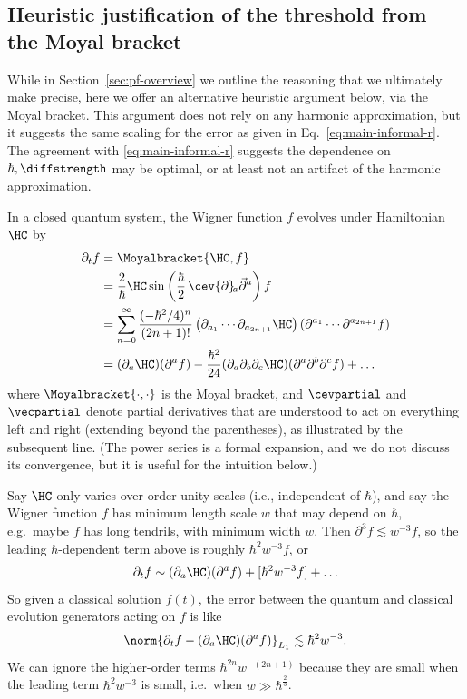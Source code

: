 \documentclass{article}
\numberwithin{equation}{section}
\begin{document}
\subsection{Heuristic justification of the  threshold from the Moyal bracket}
\label{sec:intuition-moyal}
While in Section~\ref{sec:pf-overview} we outline the reasoning that we ultimately make precise, here we offer an alternative heuristic argument below, via the Moyal bracket.  This argument does not rely on any harmonic approximation, but it suggests the same scaling for the error as given in Eq.~\eqref{eq:main-informal-r}.  The agreement with \eqref{eq:main-informal-r} suggests the dependence on $\hbar,\diffstrength$ may be optimal, or at least not an artifact of the harmonic approximation.

In a closed quantum system, the Wigner function $f$ evolves under Hamiltonian $\HC$ by \cite{curtright2014concise}
\begin{align}
    \partial_t f & = \Moyalbracket{\HC,f} \\
    &= \frac{2}{\hbar} \HC \sin \left( \frac{\hbar}{2}\, \cev{\partial}\!{}_a\vec{\partial}{}^a \right) f \\ 
    &= \sum_{n=0}^\infty \frac{(-\hbar^2/4)^n}{(2n+1)!} \left(\partial_{a_1}\cdots \partial_{a_{2n+1}} \HC\right)\left(\partial^{a_1}\cdots \partial^{a_{2n+1}} f\right) \\ 
    \label{eq:moyal-bracket-expansion}
    &= (\partial_a \HC)(\partial^a f) - \frac{\hbar^2}{24}(\partial_a\partial_b\partial_c \HC)(\partial^a \partial^b \partial^c f) + \ldots
\end{align}
where $\Moyalbracket{\cdot,\cdot}$ is the Moyal bracket, and 
$\cevpartial$ and $\vecpartial$ denote partial derivatives that are understood to act on everything left and right (extending beyond the parentheses), as illustrated by the subsequent line.
(The power series is a formal expansion, and we do not discuss its convergence, but it is useful for the intuition below.)

Say $\HC$ only varies over order-unity scales (i.e., independent of $\hbar$), and say the Wigner function $f$ has minimum length scale $w$ that may depend on $\hbar$, e.g.\ maybe $f$ has long tendrils, with minimum width $w$. 
Then $\partial^3 f \lesssim w^{-3} f$, so the leading $\hbar$-dependent term above is roughly $\hbar^2 w^{-3} f$, or  
\begin{align}\label{eq:wigner-expand}
    \partial_t f \sim (\partial_a \HC)(\partial^a f) + [\hbar^2 w^{-3} f] + \ldots
\end{align}
So given a classical solution $f(t)$, the error between the quantum and classical evolution generators acting on $f$ is like
\begin{align} \label{eq:wigner-expand-norm}
    \norm{\partial_t f - (\partial_a \HC)(\partial^a f)}_{L_1} \lesssim \hbar^2 w^{-3}.
\end{align}
We can ignore the higher-order terms $\hbar^{2n}w^{-(2n+1)}$ because they are small when the leading term $\hbar^2 w^{-3}$ is small, i.e.\ when $w \gg \hbar^{\frac23}$.
\end{document}
